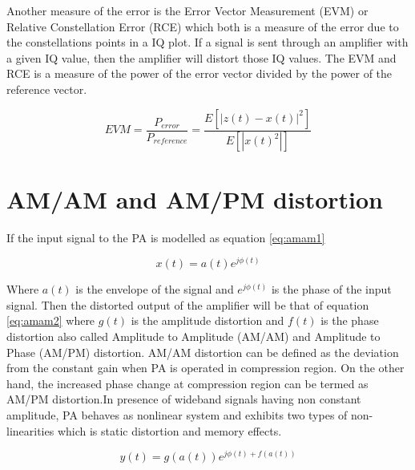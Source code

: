Another measure of the error is the Error Vector Measurement (EVM) or  Relative Constellation Error (RCE) which both is a measure of the error due to the constellations points in a IQ plot. If a signal is sent through an amplifier with a given IQ value, then the amplifier will distort those IQ values. The EVM and RCE is a measure of the power of the error vector divided by the power of the reference vector. \citep{ali2016}

\begin{equation} \label{eq:evm}
	EVM = \frac{P_{error}}{P_{reference}} = \frac{E[|z(t)-x(t)|^2]}{E[|x(t)^2|]}
\end{equation}  
 


\section{AM/AM and AM/PM distortion}
If the input signal to the PA is modelled as equation \ref{eq:amam1}

\begin{equation}\label{eq:amam1}
x(t) = a(t)e^{j\phi(t)}
\end{equation}

Where $a(t)$ is the envelope of the signal and $e^{j\phi(t)}$ is the phase of the input signal. Then the distorted output of the amplifier will be that of equation \ref{eq:amam2} where $g(t)$ is the amplitude distortion and $f(t)$ is the phase distortion also called Amplitude to Amplitude (AM/AM) and Amplitude to Phase (AM/PM) distortion. AM/AM distortion can be defined as the deviation from the constant gain when PA is
operated in compression region. On the other hand, the increased phase change at compression
region can be termed as AM/PM distortion.In presence of wideband signals having non constant amplitude, PA behaves as nonlinear system and exhibits two types of non-linearities \citep{guo2015} which is static distortion and memory effects.  

\begin{equation}\label{eq:amam2}
y(t) = g(a(t))e^{j\phi(t)+f(a(t))}
\end{equation}

